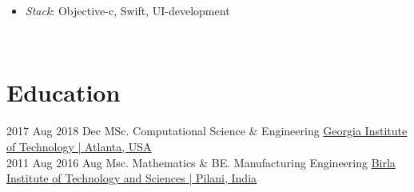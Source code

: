 \documentclass[letterpaper]{DS_class_file} %
\begin{document}
\begin{twenty}
{\begin{itemize}
           \item \textit{Stack}: Objective-c, Swift, UI-development
		\end{itemize}}
		\\
\end{twenty}


\section{Education}

\begin{twenty} %

   	\twentyitem
	    {2017 Aug}
	    {2018 Dec}
	    {\hspace{0.2cm}MSc. Computational Science \& Engineering}
	    {\href{https://www.gatech.edu/}{\textbf{} }}
	    {\hspace{0.2cm}\href{https://www.gatech.edu/}{Georgia Institute of Technology | Atlanta, USA} }
        \\
    \twentyitem
	    {2011 Aug}
	    {2016 Aug}
	    {\hspace{0.2cm}Msc. Mathematics \& BE. Manufacturing Engineering}
	    {\href{https://www.gatech.edu/}{\textbf{} }}
	    {\hspace{0.2cm}\href{https://www.bits-pilani.ac.in/}{Birla Institute of Technology and Sciences | Pilani, India} }
        \\
\end{twenty}
\end{document}
